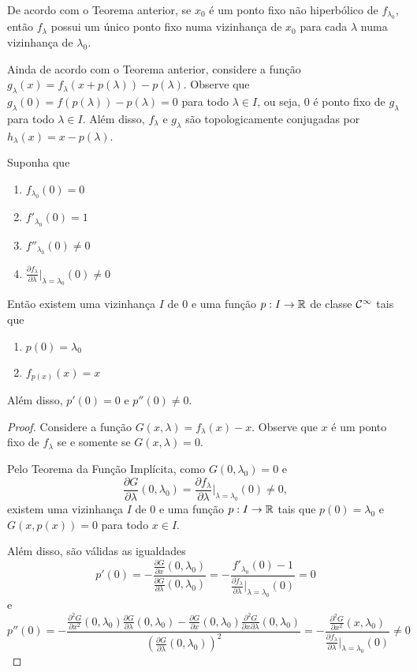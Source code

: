 De acordo com o Teorema anterior, se $x_0$ é um ponto fixo não hiperbólico de $f_{\lambda_0}$, então $f_\lambda$ possui um único ponto fixo numa vizinhança de $x_0$ para cada $\lambda$ numa vizinhança de $\lambda_0$.
 
Ainda de acordo com o Teorema anterior, considere a função $g_\lambda(x) = f_\lambda(x + p(\lambda)) - p(\lambda)$. Observe que $g_\lambda(0) = f(p(\lambda)) - p(\lambda) = 0$ para todo $\lambda \in I$, ou seja, $0$ é ponto fixo de $g_\lambda$ para todo $\lambda \in I$. Além disso, $f_\lambda$ e $g_\lambda$ são topologicamente conjugadas por $h_\lambda(x) = x - p(\lambda)$.

\begin{theorem}
Suponha que
\begin{enumerate}
\item $f_{\lambda_0}(0) = 0$
\item $f'_{\lambda_0}(0) = 1$
\item $f''_{\lambda_0}(0) \neq 0$
\item $\frac{\partial f_\lambda}{\partial \lambda} |_{\lambda = \lambda_0}(0) \neq 0$
\end{enumerate}
Então existem uma vizinhança $I$ de $0$ e uma função $p: I \to \mathbb{R}$ de classe $\mathcal{C}^\infty$ tais que
\begin{enumerate}
\item $p(0) = \lambda_0$
\item $f_{p(x)}(x) = x$
\end{enumerate}
Além disso, $p'(0) = 0$ e $p''(0) \neq 0$.
\end{theorem}

\begin{proof}
Considere a função $G(x, \lambda) = f_\lambda(x) - x$. Observe que $x$ é um ponto fixo de $f_\lambda$ se e somente se $G(x, \lambda) = 0$.

Pelo Teorema da Função Implícita, como $G(0, \lambda_0) = 0$ e 
$$\frac{\partial G}{\partial \lambda}(0, \lambda_0) = \frac{\partial f_\lambda}{\partial \lambda}|_{\lambda = \lambda_0}(0) \neq 0,$$
existem uma vizinhança $I$ de $0$ e uma função $p: I \to \mathbb{R}$ tais que $p(0) = \lambda_0$ e $G(x, p(x)) = 0$ para todo $x \in I$.

Além disso, são válidas as igualdades
$$p'(0) = - \frac{\frac{\partial G}{\partial x}(0, \lambda_0)}
{\frac{\partial G}{\partial \lambda}(0, \lambda_0)} = - \frac{f'_{\lambda_0}(0) - 1}{\frac{\partial f_\lambda}{\partial \lambda}|_{\lambda = \lambda_0}(0)} = 0$$
e
$$ p''(0) = - \frac{\frac{\partial^2 G}{\partial x^2}(0, \lambda_0)\frac{\partial G}{\partial \lambda}(0, \lambda_0) - \frac{\partial G}{\partial x}(0, \lambda_0) \frac{\partial^2 G}{ \partial x \partial \lambda}(0, \lambda_0)}
{\left( \frac{\partial G}{\partial \lambda}(0, \lambda_0) \right)^2}  = - \frac{\frac{\partial^2 G}{\partial x^2}(x, \lambda_0)}{ \frac{\partial f_\lambda}{\partial \lambda}|_{\lambda = \lambda_0}(0)} \neq 0 $$
\end{proof}

